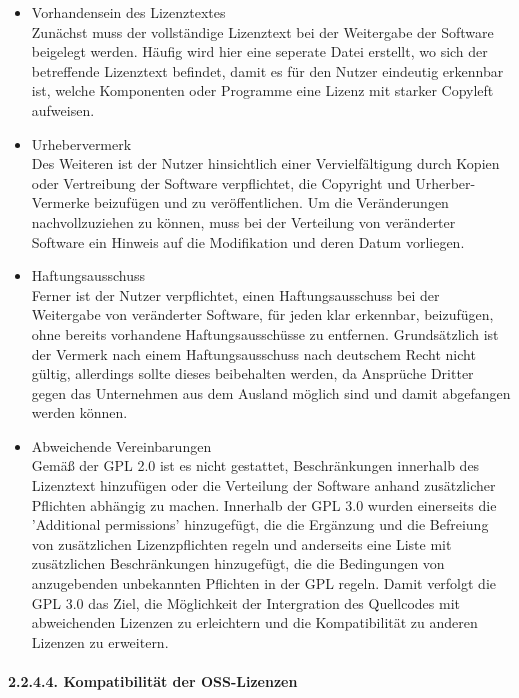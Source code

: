 \begin{itemize}
    \item Vorhandensein des Lizenztextes\\
    Zunächst muss der vollständige Lizenztext bei der Weitergabe der Software beigelegt werden. Häufig wird hier eine seperate Datei erstellt, wo sich der betreffende Lizenztext befindet, damit es für den Nutzer eindeutig erkennbar ist, welche Komponenten oder Programme eine Lizenz mit starker Copyleft aufweisen.

    \item Urhebervermerk\\
    Des Weiteren ist der Nutzer hinsichtlich einer Vervielfältigung durch Kopien oder Vertreibung der Software verpflichtet, die Copyright und Urherber-Vermerke beizufügen und zu veröffentlichen. Um die Veränderungen nachvollzuziehen zu können, muss bei der Verteilung von veränderter Software ein Hinweis auf die Modifikation und deren Datum vorliegen. 
    
    \item Haftungsausschuss\\
    Ferner ist der Nutzer verpflichtet, einen Haftungsausschuss bei der Weitergabe von veränderter Software, für jeden klar erkennbar, beizufügen, ohne bereits vorhandene Haftungsausschüsse zu entfernen. Grundsätzlich ist der Vermerk nach einem Haftungsausschuss nach deutschem Recht nicht gültig, allerdings sollte dieses beibehalten werden, da Ansprüche Dritter gegen das Unternehmen aus dem Ausland möglich sind und damit abgefangen werden können.  

    \item Abweichende Vereinbarungen\\
    Gemäß der GPL 2.0 ist es nicht gestattet, Beschränkungen innerhalb des Lizenztext hinzufügen oder die Verteilung der Software anhand zusätzlicher Pflichten abhängig zu machen. Innerhalb der GPL 3.0 wurden einerseits die 'Additional permissions' hinzugefügt, die die Ergänzung und die Befreiung von zusätzlichen Lizenzpflichten regeln und anderseits eine Liste mit zusätzlichen Beschränkungen hinzugefügt, die die Bedingungen von anzugebenden unbekannten Pflichten in der GPL regeln. Damit verfolgt die GPL 3.0 das Ziel, die Möglichkeit der Intergration des Quellcodes mit abweichenden Lizenzen zu erleichtern und die Kompatibilität zu anderen Lizenzen zu erweitern.     
\end{itemize}

\paragraph{2.2.4.4. Kompatibilität der OSS-Lizenzen}$~$

